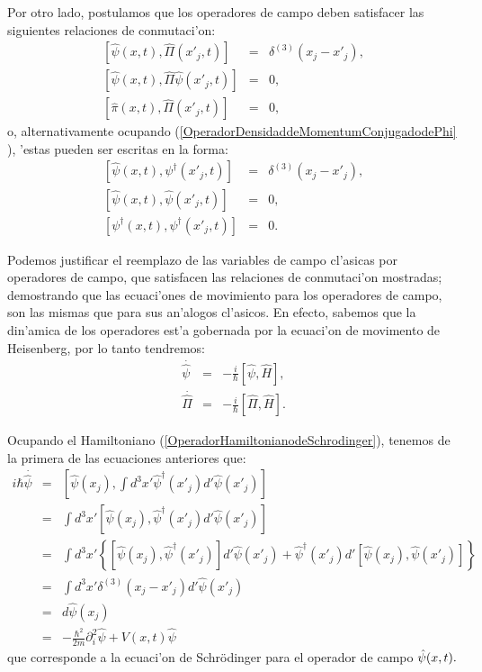 Por otro lado, postulamos que los operadores de campo deben satisfacer las
siguientes relaciones de conmutaci'on:%
\begin{eqnarray*}
\left[ \hat{\psi}(x,t),\hat{\Pi}\left( x'_{j},t\right) \right] &=&\delta
^{\left( 3\right) }\left( x_{j}-x'_{j}\right) , \\
\left[ \hat{\psi}(x,t),\hat{\Pi}\hat{\psi}\left( x'_{j},t\right) \right] &=&0,
\\
\left[ \hat{\pi}(x,t),\hat{\Pi}\left( x'_{j},t\right) \right] &=&0,
\end{eqnarray*}%
o, alternativamente ocupando (\ref{OperadorDensidaddeMomentumConjugadodePhi}%
), 'estas pueden ser escritas en la forma:%
\begin{eqnarray*}
\left[ \hat{\psi}(x,t),\psi ^{\dagger }\left( x'_{j},t\right) \right] &=&\delta
^{\left( 3\right) }\left( x_{j}-x'_{j}\right) , \\
\left[ \hat{\psi}(x,t),\hat{\psi}\left( x'_{j},t\right) \right] &=&0, \\
\left[ \psi ^{\dagger }(x,t),\psi ^{\dagger }\left( x'_{j},t\right) \right]
&=&0.
\end{eqnarray*}

Podemos justificar el reemplazo de las variables de campo cl'asicas por
operadores de campo, que satisfacen las relaciones de conmutaci'on
mostradas; demostrando que las ecuaci'ones de movimiento para los
operadores de campo, son las mismas que para sus an'alogos cl'asicos.
En efecto, sabemos que la din'amica de los operadores est'a gobernada
por la ecuaci'on de movimento de Heisenberg, por lo tanto tendremos:%
\begin{eqnarray*}
\overset{\cdot }{\hat{\psi}} &=&-\frac{i}{\hbar }\left[ \hat{\psi},\hat{H}%
\right] , \\
\overset{\cdot }{\hat{\Pi}} &=&-\frac{i}{\hbar }\left[ \hat{\Pi},\hat{H}%
\right] .
\end{eqnarray*}

Ocupando el Hamiltoniano (\ref{OperadorHamiltonianodeSchrodinger}), tenemos
de la primera de las ecuaciones anteriores que:%
\begin{eqnarray*}
i\hbar \overset{\cdot }{\hat{\psi}} &=&\left[ \hat{\psi}\left( x_{j}\right)
,\int d^{3}x'\hat{\psi}^{\dagger }\left( x'_{j}\right) d'\hat{\psi}\left(
x'_{j}\right) \right] \\
&=&\int d^{3}x'\left[ \hat{\psi}\left( x_{j}\right) ,\hat{\psi}^{\dagger }\left(
x'_{j}\right) d'\hat{\psi}\left( x'_{j}\right) \right] \\
&=&\int d^{3}x'\left\{ \left[ \hat{\psi}\left( x_{j}\right) ,\hat{\psi}^{\dagger
}\left( x'_{j}\right) \right] d'\hat{\psi}\left( x'_{j}\right)
+\hat{\psi}^{\dagger }\left( x'_{j}\right) d'\left[ \hat{\psi}\left(
x_{j}\right) ,\hat{\psi}\left( x'_{j}\right) \right] \right\} \\
&=&\int d^{3}x'\delta ^{\left( 3\right) }\left( x_{j}-x'_{j}\right)
d'\hat{\psi}\left( x'_{j}\right) \\
&=&d\hat{\psi}\left( x_{j}\right) \\
&=&-\frac{\hbar ^{2}}{2m}\partial _{i}^{2}\hat{\psi}+V(x,t)
\hat{\psi}
\end{eqnarray*}%
que corresponde a la ecuaci'on de Schr\"{o}dinger para el operador de campo
$\hat{%
\psi}(x,t) .$

